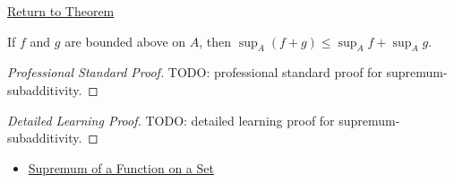 \newpage
{}
\label{prf:supremum-subadditivity}

\begin{remark*}[Return]
\hyperref[thm:supremum-subadditivity]{Return to Theorem}
\end{remark*}

\begin{theorem*}
If \(f\) and \(g\) are bounded above on \(A\), then \(\sup_A(f+g)\leq\sup_A f+\sup_A g\).
\end{theorem*}

\begin{proof}[Professional Standard Proof]
\LRAProofBodyStart
TODO: professional standard proof for supremum-subadditivity.
\end{proof}

\begin{proof}[Detailed Learning Proof]
\LRAProofBodyStart
TODO: detailed learning proof for supremum-subadditivity.
\end{proof}

\begin{remark*}
\end{remark*}

\begin{dependencies}
\begin{itemize}
  \item \hyperref[def:function-supremum-on-set]{Supremum of a Function on a Set}
\end{itemize}
\end{dependencies}

\clearpage
